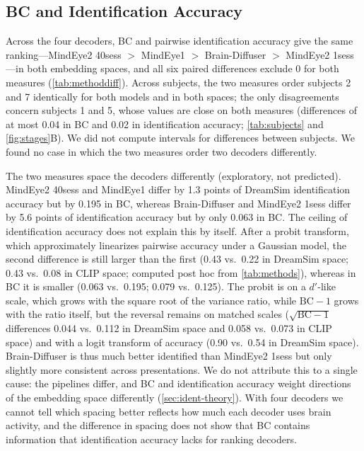 \documentclass[11pt,a4paper]{article}
\begin{document}
\subsection{BC and Identification Accuracy}
\label{sec:nsd-ident}

Across the four decoders, BC and pairwise identification accuracy give the same
ranking---MindEye2 40sess $>$ MindEye1 $>$ Brain-Diffuser $>$ MindEye2 1sess---in
both embedding spaces, and all six paired differences exclude 0 for both
measures (\cref{tab:methoddiff}). Across subjects, the two measures order
subjects 2 and 7 identically for both models and in both spaces; the only
disagreements concern subjects 1 and 5, whose values are close on both measures
(differences of at most 0.04 in BC and 0.02 in identification accuracy;
\cref{tab:subjects} and \cref{fig:stages}B). We did not compute intervals for differences between
subjects. We found no case in which the two measures order two decoders
differently.

The two measures space the decoders differently (exploratory, not predicted).
MindEye2 40sess and MindEye1 differ by 1.3 points of DreamSim identification
accuracy but by 0.195 in BC, whereas Brain-Diffuser and MindEye2 1sess differ by
5.6 points of identification accuracy but by only 0.063 in BC. The ceiling of
identification accuracy does not explain this by itself. After a probit
transform, which approximately linearizes pairwise accuracy under a Gaussian
model, the second difference is still larger than the first (0.43 vs.\ 0.22 in
DreamSim space; 0.43 vs.\ 0.08 in CLIP space; computed post hoc from
\cref{tab:methods}), whereas in BC it is smaller (0.063 vs.\ 0.195; 0.079 vs.\
0.125). The probit is on a $d'$-like scale, which grows with the square root of
the variance ratio, while $\mathrm{BC}-1$ grows with the ratio itself, but the
reversal remains on matched scales ($\sqrt{\mathrm{BC}-1}$ differences 0.044
vs.\ 0.112 in DreamSim space and 0.058 vs.\ 0.073 in CLIP space) and with a
logit transform of accuracy (0.90 vs.\ 0.54 in DreamSim space). Brain-Diffuser
is thus much better identified than MindEye2 1sess but only slightly more
consistent across presentations. We do not attribute this to a single cause:
the pipelines differ, and BC and identification accuracy weight directions of
the embedding space differently (\cref{sec:ident-theory}). With four decoders
we cannot tell which spacing better reflects how much each decoder uses brain
activity, and the difference in spacing does not show that BC contains
information that identification accuracy lacks for ranking decoders.
\end{document}
